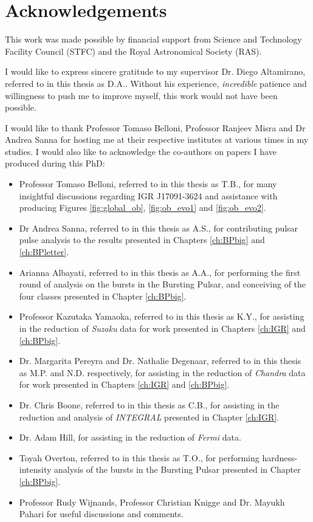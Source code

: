 \chapter*{Acknowledgements}


\par This work was made possible by financial support from Science and Technology Facility Council (STFC) and the Royal Astronomical Society (RAS).
\par I would like to express sincere gratitude to my supervisor Dr. Diego Altamirano, referred to in this thesis as \textsf{D.A.}.  Without his experience, \textit{incredible} patience and willingness to push me to improve myself, this work would not have been possible.
\par I would like to thank Professor Tomaso Belloni, Professor Ranjeev Misra and Dr Andrea Sanna for hosting me at their respective institutes at various times in my studies.  I would also like to acknowledge the co-authors on papers I have produced during this PhD:
\begin{itemize}
\item Professor Tomaso Belloni, referred to in this thesis as \textsf{T.B.}, for many insightful discussions regarding IGR J17091-3624 and assistance with producing Figures \ref{fig:global_ob}, \ref{fig:ob_evo1} and \ref{fig:ob_evo2}.
\item Dr Andrea Sanna, referred to in this thesis as \textsf{A.S.}, for contributing pulsar pulse analysis to the results presented in Chapters \ref{ch:BPbig} and \ref{ch:BPletter}.
\item Arianna Albayati, referred to in this thesis as \textsf{A.A.}, for performing the first round of analysis on the bursts in the Bursting Pulsar, and conceiving of the four classes presented in Chapter \ref{ch:BPbig}.
\item Professor Kazutaka Yamaoka, referred to in this thesis as \textsf{K.Y.}, for assisting in the reduction of \textit{Suzaku} data for work presented in Chapters \ref{ch:IGR} and \ref{ch:BPbig}.
\item Dr. Margarita Pereyra and Dr. Nathalie Degenaar, referred to in this thesis as \textsf{M.P.} and \textsf{N.D.} respectively, for assisting in the reduction of \textit{Chandra} data for work presented in Chapters \ref{ch:IGR} and \ref{ch:BPbig}.
\item Dr. Chris Boone, referred to in this thesis as \textsf{C.B.}, for assisting in the reduction and analysis of \textit{INTEGRAL} presented in Chapter \ref{ch:IGR}.
\item Dr. Adam Hill, for assisting in the reduction of \textit{Fermi} data.
\item Toyah Overton, referred to in this thesis as \textsf{T.O.}, for performing hardness-intensity analysis of the bursts in the Bursting Pulsar presented in Chapter \ref{ch:BPbig}.
\item Professor Rudy Wijnands, Professor Christian Knigge and Dr. Mayukh Pahari  for useful discussions and comments.
\end{itemize}
